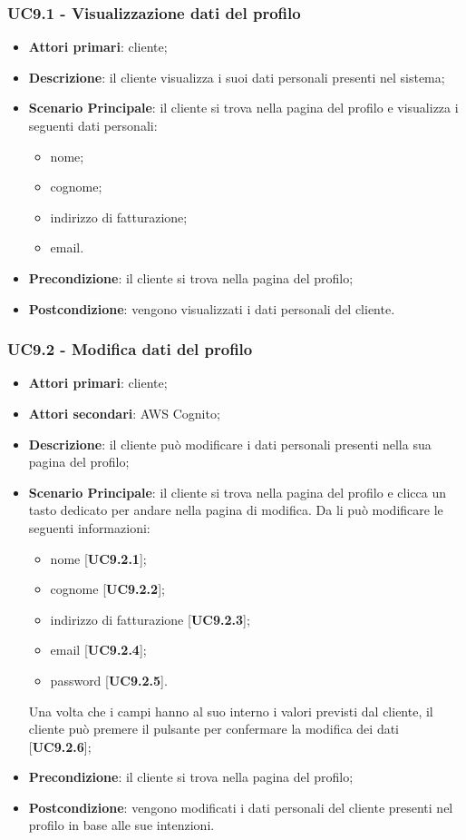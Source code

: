 \subsubsection{UC9.1 - Visualizzazione dati del profilo}
\begin{itemize}
\item \textbf{Attori primari}: cliente;
\item \textbf{Descrizione}: il cliente visualizza i suoi dati personali presenti nel sistema;
\item \textbf{Scenario Principale}: il cliente si trova nella pagina del profilo e visualizza i seguenti dati personali:
\begin{itemize}
\item nome;
\item cognome;
\item indirizzo di fatturazione;
\item email.
\end{itemize}
\item \textbf{Precondizione}: il cliente si trova nella pagina del profilo;
\item \textbf{Postcondizione}: vengono visualizzati i dati personali del cliente.
\end{itemize}

\subsubsection{UC9.2 - Modifica dati del profilo}
\begin{itemize}
\item \textbf{Attori primari}: cliente;
\item \textbf{Attori secondari}: AWS Cognito;
\item \textbf{Descrizione}: il cliente può modificare i dati personali presenti nella sua pagina del profilo;
\item \textbf{Scenario Principale}: il cliente si trova nella pagina del profilo e clicca un tasto dedicato per andare nella pagina di modifica. Da li può modificare le seguenti informazioni:
\begin{itemize}
\item nome [\textbf{UC9.2.1}];
\item cognome [\textbf{UC9.2.2}];
\item indirizzo di fatturazione [\textbf{UC9.2.3}];
\item email [\textbf{UC9.2.4}];
\item password [\textbf{UC9.2.5}].
\end{itemize}
Una volta che i campi hanno al suo interno i valori previsti dal cliente, il cliente può premere il pulsante per confermare la modifica dei dati [\textbf{UC9.2.6}];
\item \textbf{Precondizione}: il cliente si trova nella pagina del profilo;
\item \textbf{Postcondizione}: vengono modificati i dati personali del cliente presenti nel profilo in base alle sue intenzioni.
\end{itemize}

